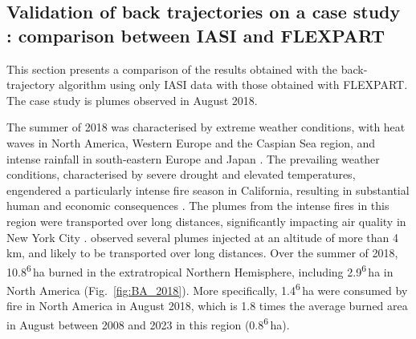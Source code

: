 \documentclass[acp, manuscript]{copernicus}
\begin{document}
\subsection{Validation of back trajectories on a case study : comparison between IASI and FLEXPART}\label{sec:FLEXPART_chap4}


This section presents a comparison of the results obtained with the back-trajectory algorithm using only IASI data with those obtained with FLEXPART. The case study is plumes observed in August 2018. %

The summer of 2018 was characterised by extreme weather conditions, with heat waves in North America, Western Europe and the Caspian Sea region, and intense rainfall in south-eastern Europe and Japan \citep{kornhuberExtremeWeatherEvents2019,rousiExtremelyHotDry2023}. The prevailing weather conditions, characterised by severe drought and elevated temperatures, engendered a particularly intense fire season in California, resulting in substantial human and economic consequences \citep{brownExtreme2018Northern2020,wangEconomicFootprintCalifornia2021}. The plumes from the intense fires in this region were transported over long distances, significantly impacting air quality in New York City \citep{wuSynergisticAircraftGround2021b}. \citet{griffin2018FireSeason2020b} observed several plumes injected at an altitude of more than 4\,km, and likely to be transported over long distances. Over the summer of 2018, 10.8\textsuperscript{6}\,ha burned in the extratropical Northern Hemisphere, including 2.9\textsuperscript{6}\,ha in North America (Fig.~\ref{fig:BA_2018}). More specifically, 1.4\textsuperscript{6}\,ha were consumed by fire in North America in August 2018, which is 1.8 times the average burned area in August between 2008 and 2023 in this region (0.8\textsuperscript{6}\,ha).
\end{document}
